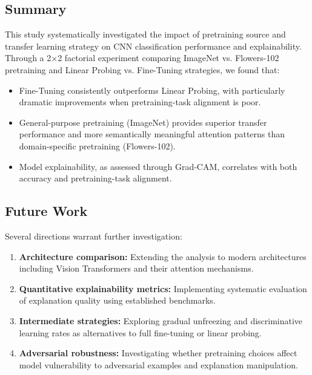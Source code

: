 \documentclass[11pt,a4paper]{article}
\begin{document}
\subsection{Summary}

This study systematically investigated the impact of pretraining source and transfer learning strategy on CNN classification performance and explainability. Through a 2×2 factorial experiment comparing ImageNet vs. Flowers-102 pretraining and Linear Probing vs. Fine-Tuning strategies, we found that:

\begin{itemize}
    \item Fine-Tuning consistently outperforms Linear Probing, with particularly dramatic improvements when pretraining-task alignment is poor.
    \item General-purpose pretraining (ImageNet) provides superior transfer performance and more semantically meaningful attention patterns than domain-specific pretraining (Flowers-102).
    \item Model explainability, as assessed through Grad-CAM, correlates with both accuracy and pretraining-task alignment.
\end{itemize}

\subsection{Future Work}

Several directions warrant further investigation:

\begin{enumerate}
    \item \textbf{Architecture comparison:} Extending the analysis to modern architectures including Vision Transformers \citep{dosovitskiy2020image} and their attention mechanisms.

    \item \textbf{Quantitative explainability metrics:} Implementing systematic evaluation of explanation quality using established benchmarks.

    \item \textbf{Intermediate strategies:} Exploring gradual unfreezing and discriminative learning rates as alternatives to full fine-tuning or linear probing.

    \item \textbf{Adversarial robustness:} Investigating whether pretraining choices affect model vulnerability to adversarial examples and explanation manipulation.
\end{enumerate}
\end{document}
